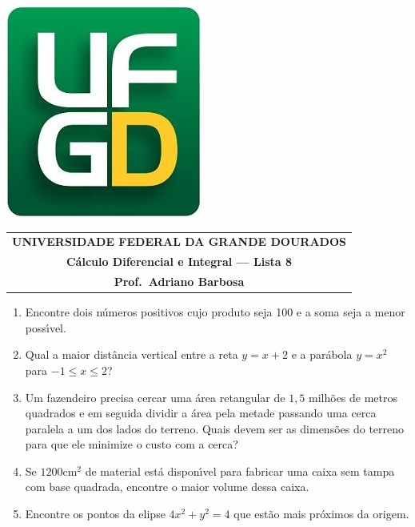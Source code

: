 \documentclass[a4paper,5pt]{amsbook}
\begin{document}
\thispagestyle{empty}
\pagestyle{empty}
\begin{minipage}[h]{0.14\textwidth}
	\includegraphics[scale=0.24]{../../ufgd.png}
\end{minipage}
\begin{minipage}[h]{\textwidth}
\begin{tabular}{c}
{{\bf UNIVERSIDADE FEDERAL DA GRANDE DOURADOS}}\\
{{\bf C\'alculo Diferencial e Integral --- Lista 8}}\\
{{\bf Prof.\ Adriano Barbosa}}\\
\end{tabular}
\vspace{-0.45cm}
%
\end{minipage}


\vspace{1cm}
\begin{enumerate}
    \vspace{0.5cm}
    \item Encontre dois n\'umeros positivos cujo produto seja 100 e a soma seja a menor poss\'{\i}vel.

    \vspace{0.5cm}
    \item Qual a maior dist\^ancia vertical entre a reta $y=x+2$ e a par\'abola $y=x^2$ para $-1\le x \le 2$?

    \vspace{0.5cm}
    \item Um fazendeiro precisa cercar uma \'area retangular de $1,5$ milh\~oes de metros
        quadrados e em seguida dividir a \'area pela metade passando uma cerca paralela a um
        dos lados do terreno. Quais devem ser as dimens\~oes do terreno para que ele
        minimize o custo com a cerca?

    \vspace{0.5cm}
    \item Se $1200$cm$^2$ de material est\'a dispon\'{\i}vel para fabricar uma caixa
        sem tampa com base quadrada, encontre o maior volume dessa caixa.

    \vspace{0.5cm}
    \item Encontre os pontos da elipse $4x^2+y^2=4$ que est\~ao mais pr\'oximos da origem.
\end{enumerate}
\end{document}
